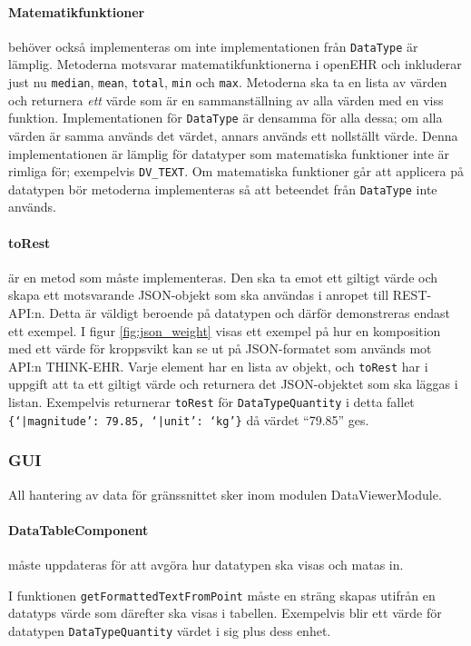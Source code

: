 \documentclass[techdoc/techdoc.tex]{subfiles}
\begin{document}
\paragraph{Matematikfunktioner} behöver också implementeras om inte
implementationen från \texttt{DataType} är lämplig. Metoderna motsvarar
matematikfunktionerna i openEHR och inkluderar just nu \texttt{median},
\texttt{mean}, \texttt{total}, \texttt{min} och \texttt{max}. Metoderna ska ta
en lista av värden och returnera \emph{ett} värde som är en sammanställning av
alla värden med en viss funktion. Implementationen för \texttt{DataType} är
densamma för alla dessa; om alla värden är samma används det värdet, annars
används ett nollställt värde. Denna implementationen är lämplig för datatyper
som matematiska funktioner inte är rimliga för; exempelvis \texttt{DV\_TEXT}.
Om matematiska funktioner går att applicera på datatypen bör metoderna
implementeras så att beteendet från \texttt{DataType} inte används.

\paragraph{toRest} är en metod som måste implementeras. Den ska ta emot ett
giltigt värde och skapa ett motsvarande JSON-objekt som ska användas i anropet
till REST-API:n. Detta är väldigt beroende på datatypen och därför demonstreras
endast ett exempel. I figur \ref{fig:json_weight} visas ett exempel på hur en
komposition med ett värde för kroppsvikt kan se ut på JSON-formatet som används
mot API:n THINK-EHR. Varje element har en lista av objekt, och \texttt{toRest}
har i uppgift att ta ett giltigt värde och returnera det JSON-objektet som ska
läggas i listan. Exempelvis returnerar \texttt{toRest} för
\texttt{DataTypeQuantity} i detta fallet
\texttt{\{`|magnitude': 79.85, `|unit': `kg'\}}
då värdet ``79.85'' ges.

\subsubsection{GUI}
All hantering av data för gränssnittet sker inom modulen DataViewerModule.

\paragraph{DataTableComponent} måste uppdateras för att avgöra hur datatypen ska visas
och matas in.

I funktionen \texttt{getFormattedTextFromPoint} måste en sträng skapas utifrån
en datatyps värde som därefter ska visas i tabellen. Exempelvis blir ett värde
för datatypen \texttt{DataTypeQuantity} värdet i sig plus dess enhet.
\end{document}
